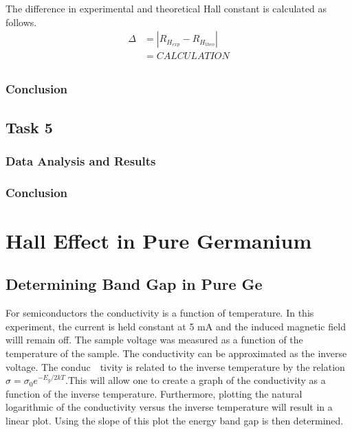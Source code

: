 \documentclass[a4paper]{article}
\begin{document}
The difference in experimental and theoretical Hall constant is calculated as follows.
\begin{align*}
\Delta &= | R_{H_{exp}} - R_{H_{theo}} | \\
	   &= CALCULATION \\
\end{align*}


\subsubsection{Conclusion}

\subsection{Task 5}

\subsubsection{Data Analysis and Results}

\subsubsection{Conclusion}

\newpage

\section{Hall Effect in Pure Germanium}

\subsection{Determining Band Gap in Pure Ge}

\qq For semiconductors the conductivity is a function of
temperature. In this experiment, the current is held constant at 5 mA
and the induced magnetic field willl remain off. The sample voltage
was measured as a function of the temperature of the sample. The
conductivity can be approximated as the inverse voltage. The
conduc\ \ tivity is related to the inverse temperature by the relation
$\sigma = \sigma_0 e^{-E_g/2kT}$.This will allow one to create a graph
of the conductivity as a function of the inverse
temperature. Furthermore, plotting the natural logarithmic of the
conductivity versus the inverse temperature will result in a linear
plot. Using the slope of this plot the energy band gap is then
determined.
\end{document}
